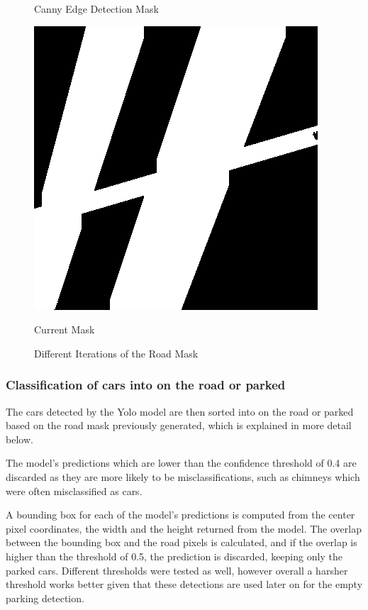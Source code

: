 \begin{figure}[htbp]
\begin{minipage}{0.45\textwidth}
        \caption*{Canny Edge Detection Mask}
    \end{minipage}
    \hfill
    \begin{minipage}{0.45\textwidth}
        \centering
        \includegraphics[width=\textwidth]{images/current_mask.png}
        \caption*{Current Mask}
    \end{minipage}
    \caption{Different Iterations of the Road Mask}
    \label{fig:Mask_Iterations}
\end{figure}

\newpage

\subsubsection{Classification of cars into on the road or parked}
The cars detected by the Yolo model are then sorted into on the road or parked based on the road mask previously generated, which is explained in more detail below.

The model's predictions which are lower than the confidence threshold of 0.4 are discarded as they are more likely to be misclassifications, such as chimneys which were often misclassified as cars.

A bounding box for each of the model's predictions is computed from the center pixel coordinates, the width and the height returned from the model.
The overlap between the bounding box and the road pixels is calculated, and if the overlap is higher than the threshold of 0.5, the prediction is discarded, keeping only the parked cars.
Different thresholds were tested as well, however overall a harsher threshold works better given that these detections are used later on for the empty parking detection.

